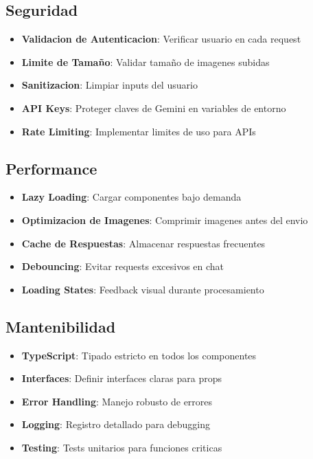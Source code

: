 \documentclass[12pt,a4paper]{article}
\begin{document}
\subsection{Seguridad}

\begin{itemize}
    \item \textbf{Validacion de Autenticacion}: Verificar usuario en cada request
    \item \textbf{Limite de Tamaño}: Validar tamaño de imagenes subidas
    \item \textbf{Sanitizacion}: Limpiar inputs del usuario
    \item \textbf{API Keys}: Proteger claves de Gemini en variables de entorno
    \item \textbf{Rate Limiting}: Implementar limites de uso para APIs
\end{itemize}

\subsection{Performance}

\begin{itemize}
    \item \textbf{Lazy Loading}: Cargar componentes bajo demanda
    \item \textbf{Optimizacion de Imagenes}: Comprimir imagenes antes del envio
    \item \textbf{Cache de Respuestas}: Almacenar respuestas frecuentes
    \item \textbf{Debouncing}: Evitar requests excesivos en chat
    \item \textbf{Loading States}: Feedback visual durante procesamiento
\end{itemize}

\subsection{Mantenibilidad}

\begin{itemize}
    \item \textbf{TypeScript}: Tipado estricto en todos los componentes
    \item \textbf{Interfaces}: Definir interfaces claras para props
    \item \textbf{Error Handling}: Manejo robusto de errores
    \item \textbf{Logging}: Registro detallado para debugging
    \item \textbf{Testing}: Tests unitarios para funciones criticas
\end{itemize}
\end{document}
